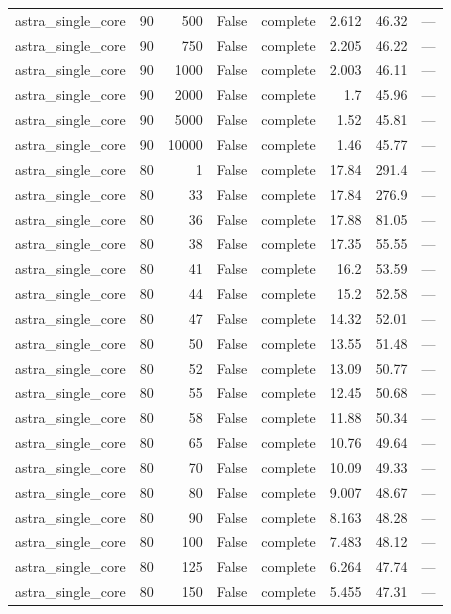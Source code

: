 \begin{tabular}{lrrrlrrl}
astra\_single\_core & 90 & 500 & False & complete & 2.612 & 46.32 & — \\
astra\_single\_core & 90 & 750 & False & complete & 2.205 & 46.22 & — \\
astra\_single\_core & 90 & 1000 & False & complete & 2.003 & 46.11 & — \\
astra\_single\_core & 90 & 2000 & False & complete & 1.7 & 45.96 & — \\
astra\_single\_core & 90 & 5000 & False & complete & 1.52 & 45.81 & — \\
astra\_single\_core & 90 & 10000 & False & complete & 1.46 & 45.77 & — \\
astra\_single\_core & 80 & 1 & False & complete & 17.84 & 291.4 & — \\
astra\_single\_core & 80 & 33 & False & complete & 17.84 & 276.9 & — \\
astra\_single\_core & 80 & 36 & False & complete & 17.88 & 81.05 & — \\
astra\_single\_core & 80 & 38 & False & complete & 17.35 & 55.55 & — \\
astra\_single\_core & 80 & 41 & False & complete & 16.2 & 53.59 & — \\
astra\_single\_core & 80 & 44 & False & complete & 15.2 & 52.58 & — \\
astra\_single\_core & 80 & 47 & False & complete & 14.32 & 52.01 & — \\
astra\_single\_core & 80 & 50 & False & complete & 13.55 & 51.48 & — \\
astra\_single\_core & 80 & 52 & False & complete & 13.09 & 50.77 & — \\
astra\_single\_core & 80 & 55 & False & complete & 12.45 & 50.68 & — \\
astra\_single\_core & 80 & 58 & False & complete & 11.88 & 50.34 & — \\
astra\_single\_core & 80 & 65 & False & complete & 10.76 & 49.64 & — \\
astra\_single\_core & 80 & 70 & False & complete & 10.09 & 49.33 & — \\
astra\_single\_core & 80 & 80 & False & complete & 9.007 & 48.67 & — \\
astra\_single\_core & 80 & 90 & False & complete & 8.163 & 48.28 & — \\
astra\_single\_core & 80 & 100 & False & complete & 7.483 & 48.12 & — \\
astra\_single\_core & 80 & 125 & False & complete & 6.264 & 47.74 & — \\
astra\_single\_core & 80 & 150 & False & complete & 5.455 & 47.31 & — \\

\end{tabular}
